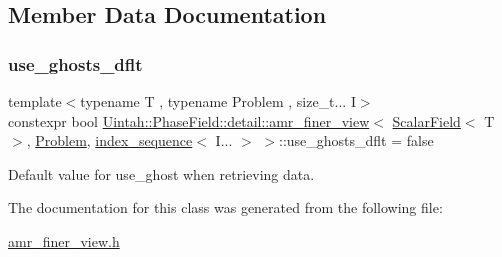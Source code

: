 \subsection{Member Data Documentation}
\mbox{\label{classUintah_1_1PhaseField_1_1detail_1_1amr__finer__view_3_01ScalarField_3_01T_01_4_00_01Problem_810ae3f886a4d3bdb2b37c629369a2ec_aee5138b1c87ec5e7717b5f1dd6fd47cd}} 
\subsubsection{\texorpdfstring{use\+\_\+ghosts\+\_\+dflt}{use\_ghosts\_dflt}}
{\footnotesize\ttfamily template$<$typename T , typename Problem , size\+\_\+t... I$>$ \\
constexpr bool \hyperlink{classUintah_1_1PhaseField_1_1detail_1_1amr__finer__view}{Uintah\+::\+Phase\+Field\+::detail\+::amr\+\_\+finer\+\_\+view}$<$ \hyperlink{structUintah_1_1PhaseField_1_1ScalarField}{Scalar\+Field}$<$ T $>$, \hyperlink{classUintah_1_1PhaseField_1_1Problem}{Problem}, \hyperlink{namespaceUintah_1_1PhaseField_a237de804d99512e50613aff7c94a9461}{index\+\_\+sequence}$<$ I... $>$ $>$\+::use\+\_\+ghosts\+\_\+dflt = false\hspace{0.3cm}{\ttfamily [static]}}



Default value for use\+\_\+ghost when retrieving data. 



The documentation for this class was generated from the following file\+:\begin{DoxyCompactItemize}
\item 
\hyperlink{amr__finer__view_8h}{amr\+\_\+finer\+\_\+view.\+h}\end{DoxyCompactItemize}
